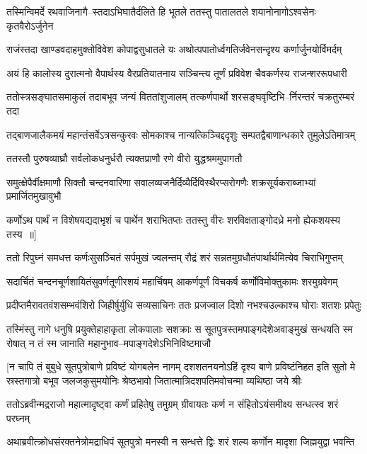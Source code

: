 \twolineshloka
{तस्मिन्विमर्दे रथवाजिनागै--स्तदाऽभिघातैर्दलिते हि भूतले}
{ततस्तु पातालतले शयानोनागोऽश्वसेनः कृतवैरोऽर्जुनेन}


\twolineshloka
{राजंस्तदा खाण्डवदाहमुक्तोविवेश कोपाद्वसुधातले यः}
{अथोत्पपातोर्ध्वगतिर्जवेनसन्दृश्य कर्णार्जुनयोर्विमर्दम्}


\twolineshloka
{अयं हि कालोस्य दुरात्मनो वैपार्थस्य वैरप्रतियातनाय}
{सञ्चिन्त्य तूर्णं प्रविवेश चैवकर्णस्य राजन्शररूपधारी}


\twolineshloka
{ततोस्त्रसङ्घातसमाकुलं तदाबभूव जन्यं विततांशुजालम्}
{तत्कर्णपार्थो शरसङ्घवृष्टिभि--र्निरन्तरं चक्रतुरम्बरं तदा}


\twolineshloka
{तद्बाणजालैकमयं महान्तंसर्वेऽत्रसन्कुरवः सोमकाश्च}
{नान्यत्किञ्चिद्ददृशुः सम्पतद्वैबाणान्धकारे तुमुलेऽतिमात्रम्}


\twolineshloka
{ततस्तौ पुरुषव्याघ्रौ सर्वलोकधनुर्धरौ}
{त्यक्तप्राणौ रणे वीरो युद्धश्रममुपागतौ}


\threelineshloka
{समुत्क्षेपैर्वीक्षमाणौ सिक्तौ चन्दनवारिणा}
{सवालव्यजनैर्दिव्यैर्दिविस्थैरप्सरोगणैः}
{शक्रसूर्यकराब्जाभ्यां प्रमार्जितमुखावुभौ}


\twolineshloka
{कर्णोऽथ पार्थं न विशेषयद्यदाभृशं च पार्थेन शराभितप्तः}
{ततस्तु वीरः शरविक्षताङ्गोदध्रे मनो ह्येकशयस्य तस्य ॥]}


\twolineshloka
{ततो रिपुघ्नं समधत्त कर्णःसुसञ्चितं सर्पमुखं ज्वलन्तम्}
{रौद्रं शरं सन्नतमुग्रधौतंपार्थार्थमित्येव चिराभिगुप्तम्}


\twolineshloka
{सदार्चितं चन्दनचूर्णशायितंसुवर्णतूणीरशयं महार्चिषम्}
{आकर्णपूर्णं विचकर्ष कर्णोविमोक्तुकामः शरमुग्रवेगम्}


\twolineshloka
{प्रदीप्तमैरावतवंशसम्भवंशिरो जिहीर्षुर्युधि सव्यसाचिनः}
{ततः प्रजज्वाल दिशो नभश्चउल्काश्च घोराः शतशः प्रपेतुः}


तस्मिंस्तु नागे धनुषि प्रयुक्तेहाहाकृता लोकपालाः सशक्राः
\twolineshloka
{स सूतपुत्रस्तमपाङ्गदेशेअवाङ्मुखं सन्धयति स्म रोषात्}
{न तं स्म जानाति महानुभाव--मपाङ्गदेशेऽभिनिविष्टमाजौ}


\threelineshloka
{[न चापि तं बुबुधे सूतपुत्रोबाणे प्रविष्टं योगबलेन नागम्}
{दशशतनयनोऽहिं दृश्य बाणे प्रविष्टंनिहत इति सुतो मे स्रस्तगात्रो बभूव}
{जलजकुसुमयोनिः श्रेष्ठभावो जितात्मात्रिदशपतिमवोचन्मा व्यथिष्ठा जये श्रीः}


\twolineshloka
{ततोऽब्रवीन्मद्रराजो महात्मादृष्ट्वा कर्णं प्रहितेषु तमुग्रम्}
{ग्रीवायतः कर्ण न संहितोऽयंसमीक्ष्य सन्धत्स्व शरं परघ्नम्}


\twolineshloka
{अथाब्रवीत्क्रोधसंरक्तनेत्रोमद्राधिपं सूतपुत्रो मनस्वी}
{न सन्धत्ते द्विः शरं शल्य कर्णोन मादृशा जिह्मयुद्वा भवन्ति}


